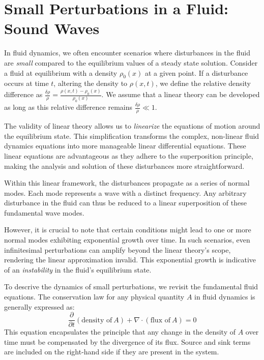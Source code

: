 \section{Small Perturbations in a Fluid: Sound Waves}

In fluid dynamics, we often encounter scenarios where disturbances in the fluid are \emph{small} compared to the equilibrium values of a steady state solution. 
%
Consider a fluid at equilibrium with a density \(\rho_0(x)\) at a given point. If a disturbance occurs at time \(t\), altering the density to \(\rho(x, t)\), we define the relative density difference as \( \frac{\delta \rho}{\rho} = \frac{\rho(x, t) - \rho_0(x)}{\rho_0(x)} \). 
%
We assume that a linear theory can be developed as long as this relative difference remains  \( \frac{\delta \rho}{\rho} \ll 1 \).

The validity of linear theory allows us to \emph{linearize} the equations of motion around the equilibrium state. This simplification transforms the complex, non-linear fluid dynamics equations into more manageable linear differential equations. These linear equations are advantageous as they adhere to the superposition principle, making the analysis and solution of these disturbances more straightforward.

Within this linear framework, the disturbances propagate as a series of normal modes. Each mode represents a wave with a distinct frequency. Any arbitrary disturbance in the fluid can thus be reduced to a linear superposition of these fundamental wave modes. 

However, it is crucial to note that certain conditions might lead to one or more normal modes exhibiting exponential growth over time. In such scenarios, even infinitesimal perturbations can amplify beyond the linear theory's scope, rendering the linear approximation invalid. This exponential growth is indicative of an \emph{instability} in the fluid's equilibrium state.

To descrive the dynamics of small perturbations, we revisit the fundamental fluid equations. 
%
The conservation law for any physical quantity \(A\) in fluid dynamics is generally expressed as:
%
\[
\frac{\partial}{\partial t} (\text{density of}~A) + \nabla \cdot (\text{flux of}~A) = 0
\]
%
This equation encapsulates the principle that any change in the density of \(A\) over time must be compensated by the divergence of its flux. Source and sink terms are included on the right-hand side if they are present in the system.

